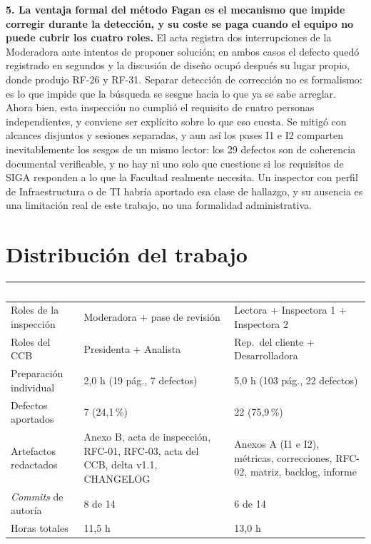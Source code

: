 \documentclass[11pt,letterpaper]{article}
\newcommand{\thead}[1]{\cellcolor{uteqverde}\textcolor{white}{\textbf{#1}}}
\begin{document}
\textbf{5. La ventaja formal del método Fagan es el mecanismo que impide corregir durante la detección, y su coste se paga cuando el equipo no puede cubrir los cuatro roles.} El acta registra dos interrupciones de la Moderadora ante intentos de proponer solución; en ambos casos el defecto quedó registrado en segundos y la discusión de diseño ocupó después su lugar propio, donde produjo RF-26 y RF-31. Separar detección de corrección no es formalismo: es lo que impide que la búsqueda se sesgue hacia lo que ya se sabe arreglar. Ahora bien, esta inspección no cumplió el requisito de cuatro personas independientes, y conviene ser explícito sobre lo que eso cuesta. Se mitigó con alcances disjuntos y sesiones separadas, y aun así los pases I1 e I2 comparten inevitablemente los sesgos de un mismo lector: los 29 defectos son de coherencia documental verificable, y no hay ni uno solo que cuestione si los requisitos de SIGA responden a lo que la Facultad realmente necesita. Un inspector con perfil de Infraestructura o de TI habría aportado esa clase de hallazgo, y su ausencia es una limitación real de este trabajo, no una formalidad administrativa.

\section{Distribución del trabajo}

\begin{center}
\small
\begin{tabular}{|p{5.0cm}|p{4.6cm}|p{4.6cm}|}
\hline
\thead{Actividad} & \thead{Muñoz Yeranick} & \thead{Chavarria Tahiny} \\ \hline
Roles de la inspección & Moderadora + pase de revisión & Lectora + Inspectora 1 + Inspectora 2 \\ \hline
Roles del CCB & Presidenta + Analista & Rep.\ del cliente + Desarrolladora \\ \hline
Preparación individual & 2,0 h (19 pág., 7 defectos) & 5,0 h (103 pág., 22 defectos) \\ \hline
Defectos aportados & 7 (24,1\,\%) & 22 (75,9\,\%) \\ \hline
Artefactos redactados & Anexo B, acta de inspección, RFC-01, RFC-03, acta del CCB, delta v1.1, CHANGELOG & Anexos A (I1 e I2), métricas, correcciones, RFC-02, matriz, backlog, informe \\ \hline
\emph{Commits} de autoría & 8 de 14 & 6 de 14 \\ \hline
Horas totales & 11,5 h & 13,0 h \\ \hline
\end{tabular}
\end{center}
\end{document}
